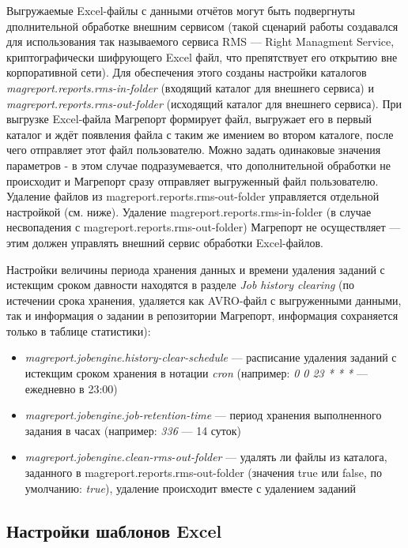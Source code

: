 \documentclass[../user-manual.tex]{subfiles}
\begin{document}
	Выгружаемые Excel-файлы с данными отчётов могут быть подвергнуты дполнительной обработке внешним сервисом (такой сценарий работы создавался для использования так называемого сервиса RMS --- Right Managment Service, криптографически шифрующего Excel файл, что препятствует его открытию вне корпоративной сети). Для обеспечения этого созданы настройки каталогов \textit{magreport.reports.rms-in-folder} (входящий каталог для внешнего сервиса) и \textit{magreport.reports.rms-out-folder} (исходящий каталог для внешнего сервиса). При выгрузке Excel-файла Магрепорт формирует файл, выгружает его в первый каталог и ждёт появления файла с таким же имением во втором каталоге, после чего отправляет этот файл пользователю. Можно задать одинаковые значения параметров - в этом случае подразумевается, что дополнительной обработки не происходит и Магрепорт сразу отправляет выгруженный файл пользователю. Удаление файлов из magreport.reports.rms-out-folder управляется отдельной настройкой (см. ниже). Удаление magreport.reports.rms-in-folder (в случае несвопадения с magreport.reports.rms-out-folder) Магрепорт не осуществляет --- этим должен управлять внешний сервис обработки Excel-файлов.

	Настройки величины периода хранения данных и времени удаления заданий с истекщим сроком давности находятся в разделе \textit{Job history clearing} (по истечении срока хранения, удаляется как AVRO-файл с выгруженными данными, так и информация о задании в репозитории Магрепорт, информация сохраняется только в таблице статистики):
	
	\begin{itemize}
		\item \textit{magreport.jobengine.history-clear-schedule} --- расписание удаления заданий с истекщим сроком хранения в нотации \textit{cron} (например: \textit{0 0 23 * * *} --- ежедневно в 23:00)
		
		\item \textit{magreport.jobengine.job-retention-time} --- период хранения выполненного задания в часах (например: \textit{336} --- 14 суток)
		
		\item \textit{magreport.jobengine.clean-rms-out-folder} --- удалять ли файлы из каталога, заданного в magreport.reports.rms-out-folder (значения true или false, по умолчанию: \textit{true}), удаление происходит вместе с удалением заданий
		
	\end{itemize}
	
	\subsection{Настройки шаблонов Excel}\label{subsection:excel-template-settings}
	
\end{document}

